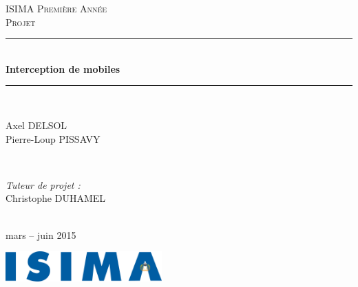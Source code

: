 \begin{titlepage}
  \newcommand{\HRule}{\rule{\linewidth}{0.5mm}}
  \center
  \null{}
  \vspace{1cm}

  \textsc{\LARGE ISIMA Première Année}\\[1.5cm]
  \textsc{\Large Projet}\\[1.5cm]
  \HRule \\[0.4cm]
  { \huge \bfseries Interception de mobiles}\\
  \HRule \\[1.5cm]

  \begin{center}
    \boxed{
      \begin{tikzpicture}[scale=1]
        
      \end{tikzpicture}
    }
  \end{center}
  \vfill

  \begin{minipage}{0.4\textwidth}
    \begin{flushleft} \large
      Axel DELSOL\\
      Pierre-Loup PISSAVY\\
    \end{flushleft}
  \end{minipage}
  ~
  \begin{minipage}{0.4\textwidth}
    \begin{flushright} \large
      \emph{Tuteur de projet :} \\
      Christophe DUHAMEL
    \end{flushright}
  \end{minipage}\\[1cm]

  {\large mars -- juin 2015}\\[1cm]

  \vfill

  \includegraphics[width=6cm]{settings/ISIMA_logo.pdf}\\[1cm]
\end{titlepage}
